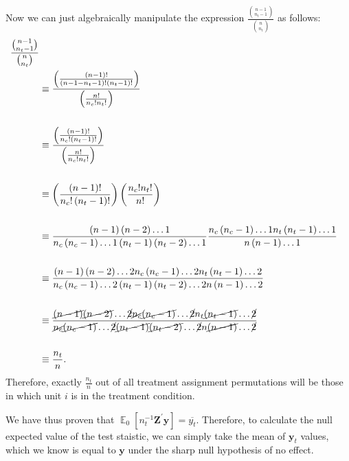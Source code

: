 \documentclass[11pt]{article}\usepackage[]{graphicx}\usepackage[]{color}
\theoremstyle{newstyle}
\DeclareMathOperator{\E}{\mathbb{E}}
\begin{document}
Now we can just algebraically manipulate the expression $\frac{{n - 1 \choose n_t - 1}}{{n \choose n_t}}$ as follows:
\begin{align*}
\frac{{n - 1 \choose n_t - 1}}{{n \choose n_t}} \\
& \equiv \frac{\left(\frac{\left(n - 1\right)!}{\left(n - 1 - n_t - 1\right)!\left(n_t - 1\right)!}\right)}{\left(\frac{n!}{n_c!n_t!}\right)} \\
\\
& \equiv \frac{\left(\frac{\left(n - 1\right)!}{n_c!\left(n_t - 1\right)!}\right)}{\left(\frac{n!}{n_c!n_t!}\right)} \\
\\
& \equiv \left(\frac{\left(n - 1\right)!}{n_c!\left(n_t - 1\right)!}\right)\left(\frac{n_c!n_t!}{n!}\right) \\
\\
& \equiv \frac{\left(n - 1\right)\left(n - 2\right) \dots 1}{n_c\left(n_c - 1\right) \dots 1 \left(n_t - 1\right)\left(n_t - 2\right) \dots 1} \frac{n_c\left(n_c - 1\right) \dots 1 n_t \left(n_t - 1\right) \dots 1}{n\left(n - 1\right) \dots 1} \\
\\
& \equiv \frac{\left(n - 1\right)\left(n - 2\right) \dots 2 n_c\left(n_c - 1\right) \dots 2 n_t \left(n_t - 1\right) \dots 2}{n_c\left(n_c - 1\right) \dots 2 \left(n_t - 1\right)\left(n_t - 2\right) \dots 2 n\left(n - 1\right) \dots 2} \\
\\
& \equiv \frac{\cancel{\left(n - 1\right)}\cancel{\left(n - 2\right)} \dots \cancel{2} \cancel{n_c}\cancel{\left(n_c - 1\right)} \dots \cancel{2} n_t \cancel{\left(n_t - 1\right)} \dots \cancel{2}}{\cancel{n_c}\cancel{\left(n_c - 1\right)} \dots \cancel{2} \cancel{\left(n_t - 1\right)}\cancel{\left(n_t - 2\right)} \dots \cancel{2} n\cancel{\left(n - 1\right)} \dots \cancel{2}} \\
\\
& \equiv \frac{n_t}{n}.
\end{align*}
Therefore, exactly $\frac{n_t}{n}$ out of all treatment assignment permutations will be those in which unit $i$ is in the treatment condition. 

We have thus proven that $\E_0\left[n_t^{-1} \mathbf{Z}^{\prime}\mathbf{y}\right] = \overline{y_t}$. Therefore, to calculate the null expected value of the test staistic, we can simply take the mean of $\mathbf{y}_t$ values, which we know is equal to $\mathbf{y}$ under the sharp null hypothesis of no effect.
\end{document}

